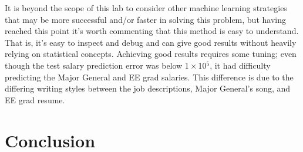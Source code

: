 \documentclass[12pt]{article}
\begin{document}
    \begin{center} 
        

    \end{center}

    It is beyond the scope of this lab to consider other machine learning
    strategies that may be more successful and/or faster in solving this
    problem, but having reached this point it's worth commenting that this
    method is easy to understand.  That is, it's easy to inspect and debug and
    can give good results without heavily relying on statistical concepts.
    Achieving good results requires some tuning; even though the test salary
    prediction error was below 1\,$\times$\,10$^5$, it had difficulty predicting
    the Major General and EE grad salaries.  This difference is due to the
    differing writing styles between the job descriptions, Major General's
    song, and EE grad resume.
    
\section{Conclusion}
\end{document}
